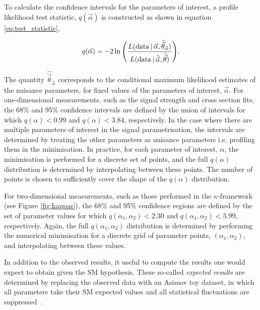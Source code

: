 To calculate the confidence intervals for the parameters of interest, a profile likelihood test statistic, $q(\vec{\alpha})$ is constructed as shown in equation \ref{eq:test_statistic},

\begin{equation}\label{eq:test_statistic}
    q(\vec{\alpha}) = -2 \ln \Bigg( \frac{L({\rm{data}}\,|\,\vec{\alpha},\hat{\vec{\theta}}_{\vec{\alpha}})}{L({\rm{data}}\,|\,\hat{\vec{\alpha}},\hat{\vec{\theta}})} \Bigg).
\end{equation}

\noindent
The quantity $\hat{\vec{\theta}}_{\vec{\alpha}}$ corresponds to the conditional maximum likelihood estimates of the nuisance parameters, for fixed values of the parameters of interest, $\vec{\alpha}$. For one-dimensional measurements, such as the signal strength and cross section fits, the 68\% and 95\% confidence intervals are defined by the union of intervals for which $q(\alpha)<0.99$ and $q(\alpha)<3.84$, respectively. In the case where there are multiple parameters of interest in the signal parametrisation, the intervals are determined by treating the other parameters as nuisance parameters i.e. profiling them in the minimisation. In practice, for each parameter of interest, $\alpha$, the minimisation is performed for a discrete set of points, and the full $q(\alpha)$ distribution is determined by interpolating between these points. The number of points is chosen to sufficiently cover the shape of the $q(\alpha)$ distribution.

For two-dimensional measurements, such as those performed in the $\kappa$-framework (see Figure \ref{fig:kappas}), the 68\% and 95\% confidence regions are defined by the set of parameter values for which $q(\alpha_1,\alpha_2)<2.30$ and $q(\alpha_1,\alpha_2)<5.99$, respectively. Again, the full $q(\alpha_1,\alpha_2)$ distribution is determined by performing the numerical minimisation for a discrete grid of parameter points, $(\alpha_1,\alpha_2)$, and interpolating between these values.

In addition to the observed results, it useful to compute the results one would expect to obtain given the SM hypothesis. These so-called \textit{expected results} are determined by replacing the observed data with an Asimov toy dataset, in which all parameters take their SM expected values and all statistical fluctuations are suppressed~\cite{Cowan:2010js}.


